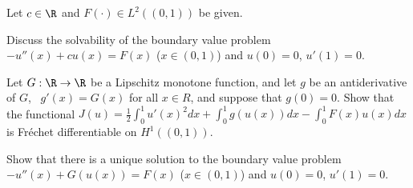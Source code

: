 Let $c\in \R$ and $F(\cdot )\in L^2((0,1))$ be given.
\begin{alist}
\item Discuss the solvability of the boundary value problem
$-u''(x)+cu(x)=F(x)$ ($x\in (0,1)$) and $u(0)=0$, $u'(1)=0$.
\item Let $G:\R\rightarrow \R$ be a Lipschitz monotone
function, and let $g$ be an antiderivative of $G$, \ie\ $g'(x)=G(x)$
for all $x\in R$, and suppose that $g(0)=0$. Show that the functional
$J(u)=\frac{1}{2}\int_0^1 u'(x)^2
dx+\int_0^1g(u(x))dx-\int_0^1F(x)u(x)dx$ is Fr\'echet differentiable
on $H^1((0,1))$.
\item Show that there is a unique solution to the boundary value
problem $-u''(x)+G(u(x))=F(x)$ ($x\in (0,1)$) and $u(0)=0$, $u'(1)=0$.
\end{alist}
